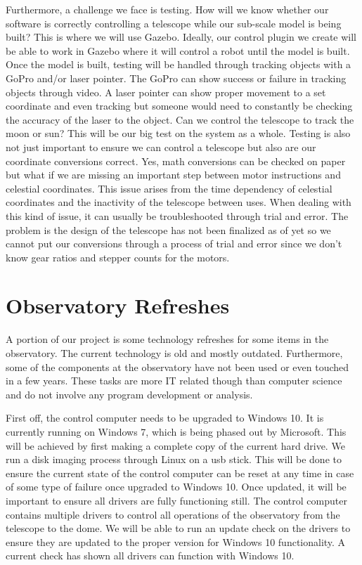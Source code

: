 \documentclass[12pt]{report}
\begin{document}
Furthermore, a challenge we face is testing. How will we know whether our software is correctly controlling a telescope while our sub-scale model is being built? This is where we will use Gazebo. Ideally, our control plugin we create will be able to work in Gazebo where it will control a robot until the model is built. Once the model is built, testing will be handled through tracking objects with a GoPro and/or laser pointer. The GoPro can show success or failure in tracking objects through video. A laser pointer can show proper movement to a set coordinate and even tracking but someone would need to constantly be checking the accuracy of the laser to the object. Can we control the telescope to track the moon or sun? This will be our big test on the system as a whole. Testing is also not just important to ensure we can control a telescope but also are our coordinate conversions correct. Yes, math conversions can be checked on paper but what if we are missing an important step between motor instructions and celestial coordinates. This issue arises from the time dependency of celestial coordinates and the inactivity of the telescope between uses. When dealing with this kind of issue, it can usually be troubleshooted through trial and error. The problem is the design of the telescope has not been finalized as of yet so we cannot put our conversions through a process of trial and error since we don’t know gear ratios and stepper counts for the motors.

\section*{Observatory Refreshes}

A portion of our project is some technology refreshes for some items in the observatory. The current technology is old and mostly outdated. Furthermore, some of the components at the observatory have not been used or even touched in a few years. These tasks are more IT related though than computer science and do not involve any program development or analysis.

First off, the control computer needs to be upgraded to Windows 10. It is currently running on Windows 7, which is being phased out by Microsoft. This will be achieved by first making a complete copy of the current hard drive. We run a disk imaging process through Linux on a usb stick. This will be done to ensure the current state of the control computer can be reset at any time in case of some type of failure once upgraded to Windows 10. Once updated, it will be important to ensure all drivers are fully functioning still. The control computer contains multiple drivers to control all operations of the observatory from the telescope to the dome. We will be able to run an update check on the drivers to ensure they are updated to the proper version for Windows 10 functionality. A current check has shown all drivers can function with Windows 10.
\end{document}
